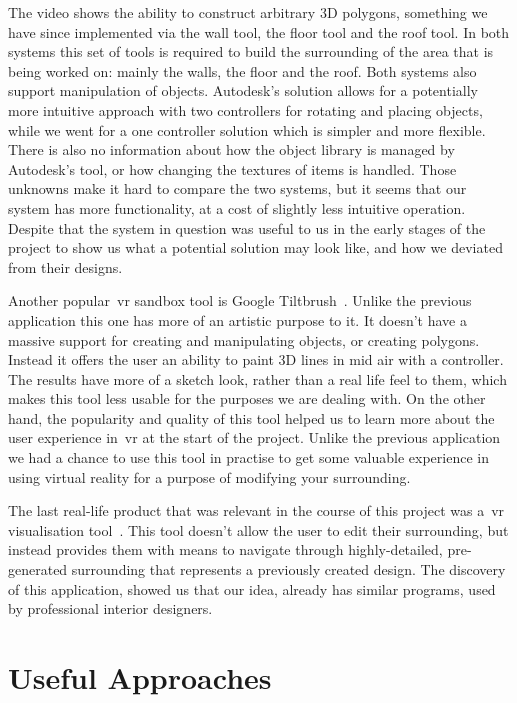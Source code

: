     The video shows the ability to construct arbitrary 3D polygons, something we have since implemented via the wall tool, the floor tool and the roof tool. In both systems this set of tools is required to build the surrounding of the area that is being worked on: mainly the walls, the floor and the roof. Both systems also support manipulation of objects. Autodesk's solution allows for a potentially more intuitive approach with two controllers for rotating and placing objects, while we went for a one controller solution which is simpler and more flexible. There is also no information about how the object library is managed by Autodesk's tool, or how changing the textures of items is handled. Those unknowns make it hard to compare the two systems, but it seems that our system has more functionality, at a cost of slightly less intuitive operation. Despite that the system in question was useful to us in the early stages of the project to show us what a potential solution may look like, and how we deviated from their designs.

    Another popular~\acrshort{vr} sandbox tool is Google Tiltbrush~\cite{google_tiltbrush}. Unlike the previous application this one has more of an artistic purpose to it. It doesn't have a massive support for creating and manipulating objects, or creating polygons. Instead it offers the user an ability to paint 3D lines in mid air with a controller. The results have more of a sketch look, rather than a real life feel to them, which makes this tool less usable for the purposes we are dealing with. On the other hand, the popularity and quality of this tool helped us to learn more about the user experience in~\acrshort{vr} at the start of the project. Unlike the previous application we had a chance to use this tool in practise to get some valuable experience in using virtual reality for a purpose of modifying your surrounding.

    The last real-life product that was relevant in the course of this project was a~\acrshort{vr} visualisation tool~\cite{arch_virtual_oculus}. This tool doesn't allow the user to edit their surrounding, but instead provides them with means to navigate through highly-detailed, pre-generated surrounding that represents a previously created design. The discovery of this application, showed us that our  idea, already has similar programs, used by professional interior designers.


\section{Useful Approaches}
\label{sec:algos}

